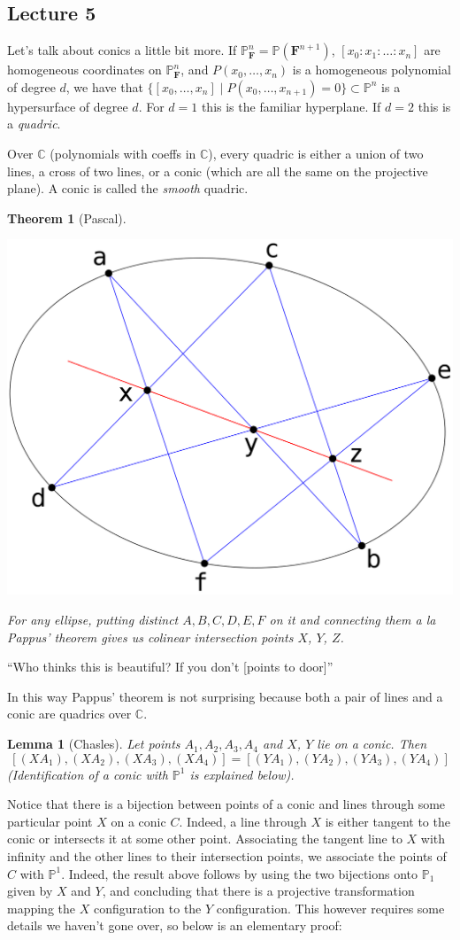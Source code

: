 \documentclass[12pt]{article}
\newcommand{\F}{\mathbf{F}}
\newcommand{\C}{\mathbb{C}}
\renewcommand{\P}{\mathbb{P}}
\newtheorem{theorem}{Theorem}[section]
\newtheorem{lemma}{Lemma}[section]
\begin{document}
    \subsection{Lecture 5}
    Let's talk about conics a little bit more. If $\P_\F^n = \P(\F^{n+1})$, $[x_0: x_1: \dots : x_n]$ are homogeneous coordinates on $\P_\F^n$, and $P(x_0, \dots, x_n)$ is a homogeneous polynomial of degree $d$, we have that $\{[x_0, \dots, x_n] \mid P(x_0, \dots, x_{n+1}) = 0\} \subset \P^n$ is a hypersurface of degree $d$. For $d = 1$ this is the familiar hyperplane. If $d = 2$ this is a \textit{quadric}. \par 
    Over $\C$ (polynomials with coeffs in $\C$), every quadric is either a union of two lines, a cross of two lines, or a conic (which are all the same on the projective plane). A conic is called the \textit{smooth} quadric. \par 
    \begin{theorem}[Pascal]
        \hfill
        \begin{center}
            \includegraphics[width = 0.4\linewidth]{pascal.png}
        \end{center}
        For any ellipse, putting distinct $A, B, C, D, E, F$ on it and connecting them a la Pappus' theorem gives us colinear intersection points $X$, $Y$, $Z$. 
    \end{theorem}
    ``Who thinks this is beautiful? If you don't [points to door]''\par 
    In this way Pappus' theorem is not surprising because both a pair of lines and a conic are quadrics over $\C$. \par 
    \begin{lemma}[Chasles]
        Let points $A_1, A_2, A_3, A_4$ and $X$, $Y$ lie on a conic. Then 
        $$[(XA_1), (XA_2), (XA_3), (XA_4)] =  [(YA_1), (YA_2), (YA_3), (YA_4)]$$
        (Identification of a conic with $\P^1$ is explained below).
    \end{lemma}
    Notice that there is a bijection between points of a conic and lines through some particular point $X$ on a conic $C$. Indeed, a line through $X$ is either tangent to the conic or intersects it at some other point. Associating the tangent line to $X$ with infinity and the other lines to their intersection points, we associate the points of $C$ with $\P^1$. Indeed, the result above follows by using the two bijections onto $\P_1$ given by $X$ and $Y$, and concluding that there is a projective transformation mapping the $X$ configuration to the $Y$ configuration. This however requires some details we haven't gone over, so below is an elementary proof:
\end{document}
